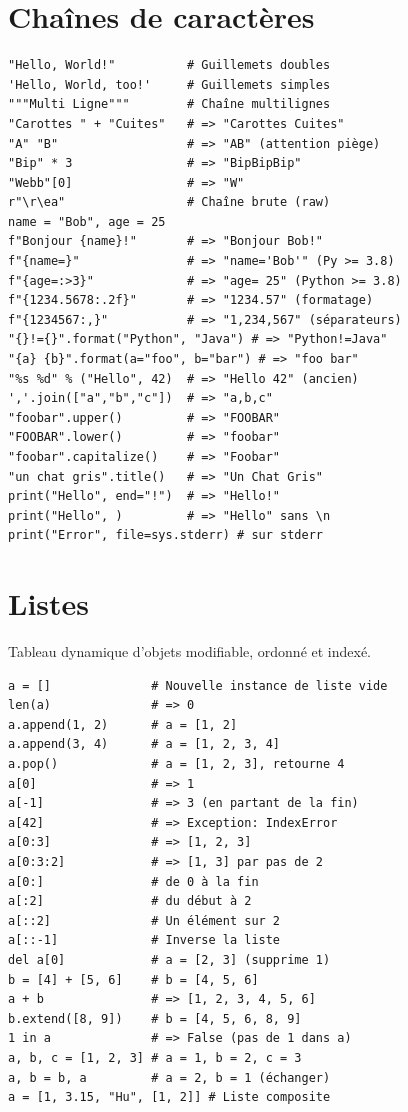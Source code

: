 \documentclass{article}
\begin{document}
\begin{multicols*}{4}
\section*{Chaînes de caractères}

\begin{lstlisting}
"Hello, World!"          # Guillemets doubles
'Hello, World, too!'     # Guillemets simples
"""Multi Ligne"""        # Chaîne multilignes
"Carottes " + "Cuites"   # => "Carottes Cuites"
"A" "B"                  # => "AB" (attention piège)
"Bip" * 3                # => "BipBipBip"
"Webb"[0]                # => "W"
r"\r\ea"                 # Chaîne brute (raw)
name = "Bob", age = 25
f"Bonjour {name}!"       # => "Bonjour Bob!"
f"{name=}"               # => "name='Bob'" (Py >= 3.8)
f"{age=:>3}"             # => "age= 25" (Python >= 3.8)
f"{1234.5678:.2f}"       # => "1234.57" (formatage)
f"{1234567:,}"           # => "1,234,567" (séparateurs)
"{}!={}".format("Python", "Java") # => "Python!=Java"
"{a} {b}".format(a="foo", b="bar") # => "foo bar"
"%s %d" % ("Hello", 42)  # => "Hello 42" (ancien)
','.join(["a","b","c"])  # => "a,b,c"
"foobar".upper()         # => "FOOBAR"
"FOOBAR".lower()         # => "foobar"
"foobar".capitalize()    # => "Foobar"
"un chat gris".title()   # => "Un Chat Gris"
print("Hello", end="!")  # => "Hello!"
print("Hello", )         # => "Hello" sans \n
print("Error", file=sys.stderr) # sur stderr
\end{lstlisting}

\section*{Listes}
Tableau dynamique d'objets modifiable, ordonné et indexé.
\begin{lstlisting}
a = []              # Nouvelle instance de liste vide
len(a)              # => 0
a.append(1, 2)      # a = [1, 2]
a.append(3, 4)      # a = [1, 2, 3, 4]
a.pop()             # a = [1, 2, 3], retourne 4
a[0]                # => 1
a[-1]               # => 3 (en partant de la fin)
a[42]               # => Exception: IndexError
a[0:3]              # => [1, 2, 3]
a[0:3:2]            # => [1, 3] par pas de 2
a[0:]               # de 0 à la fin
a[:2]               # du début à 2
a[::2]              # Un élément sur 2
a[::-1]             # Inverse la liste
del a[0]            # a = [2, 3] (supprime 1)
b = [4] + [5, 6]    # b = [4, 5, 6]
a + b               # => [1, 2, 3, 4, 5, 6]
b.extend([8, 9])    # b = [4, 5, 6, 8, 9]
1 in a              # => False (pas de 1 dans a)
a, b, c = [1, 2, 3] # a = 1, b = 2, c = 3
a, b = b, a         # a = 2, b = 1 (échanger)
a = [1, 3.15, "Hu", [1, 2]] # Liste composite
\end{lstlisting}


\end{multicols*}
\end{document}

